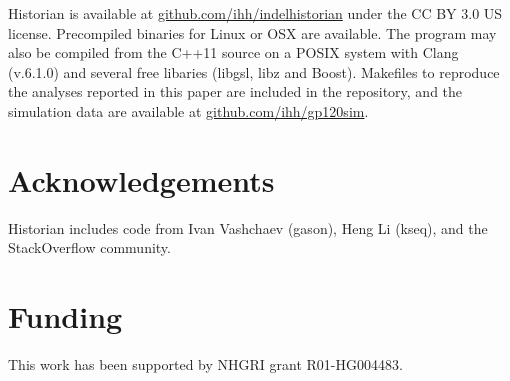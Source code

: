 \documentclass{bioinfo}
\begin{document}
Historian is available at \url{github.com/ihh/indelhistorian} under the CC BY 3.0 US license.
Precompiled binaries for Linux or OSX are available.
The program may also be compiled from the C++11 source
on a POSIX system with Clang (v.6.1.0) and several free libaries (libgsl, libz and Boost).
Makefiles to reproduce the analyses reported in this paper
are included in the repository, and the simulation data
are available at \url{github.com/ihh/gp120sim}.

\section*{Acknowledgements}

Historian includes code from Ivan Vashchaev (gason), Heng Li (kseq), %
and the StackOverflow community.

\section*{Funding}

This work has been supported by NHGRI grant R01-HG004483.


%
%
%
%
%
%
%
%



\end{document}
